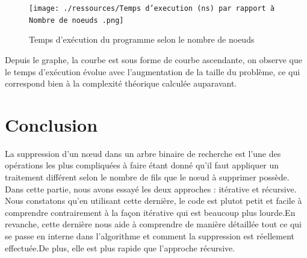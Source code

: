 \begin{figure}[H]
    \centering
        \texttt{[image: ./ressources/Temps d'execution (ns) par rapport à Nombre de noeuds .png]}
        \caption{Temps d'exécution du programme selon le nombre de noeuds}
    \label{fig:temps_exec_noeuds}
\end{figure}
\par
Depuis le graphe, la courbe est sous forme de courbe ascendante, on observe que le temps d'exécution évolue avec l'augmentation de la taille du problème, ce qui correspond bien à la complexité théorique calculée auparavant. 

\section{Conclusion}
La suppression d’un nœud dans un arbre binaire de recherche est l’une des opérations les plus compliquées à faire étant donné qu’il faut appliquer un traitement différent selon le nombre de fils que le nœud à supprimer possède.  Dans cette partie, nous avons essayé les deux approches : itérative et récursive. Nous constatons qu’en utilisant cette dernière, le code est plutot petit et facile à comprendre contrairement à la façon itérative qui est beaucoup plus lourde.En revanche, cette dernière nous aide à comprendre de manière détaillée tout ce qui se passe en interne dans l'algorithme et comment la suppression est réellement effectuée.De plus, elle est plus rapide que l'approche récursive.

